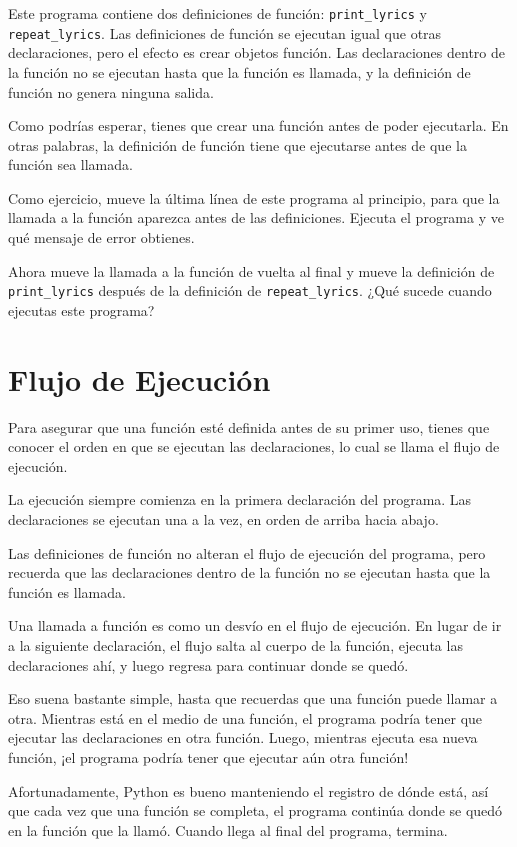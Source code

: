 \documentclass[12pt,letterpaper]{book}
\begin{document}
Este programa contiene dos definiciones de función: \texttt{print\_lyrics} y \texttt{repeat\_lyrics}. Las definiciones de función se ejecutan igual que otras declaraciones, pero el efecto es crear objetos función. Las declaraciones dentro de la función no se ejecutan hasta que la función es llamada, y la definición de función no genera ninguna salida.

Como podrías esperar, tienes que crear una función antes de poder ejecutarla. En otras palabras, la definición de función tiene que ejecutarse antes de que la función sea llamada.

Como ejercicio, mueve la última línea de este programa al principio, para que la llamada a la función aparezca antes de las definiciones. Ejecuta el programa y ve qué mensaje de error obtienes.

Ahora mueve la llamada a la función de vuelta al final y mueve la definición de \texttt{print\_lyrics} después de la definición de \texttt{repeat\_lyrics}. ¿Qué sucede cuando ejecutas este programa?

\section{Flujo de Ejecución}

Para asegurar que una función esté definida antes de su primer uso, tienes que conocer el orden en que se ejecutan las declaraciones, lo cual se llama el flujo de ejecución.

La ejecución siempre comienza en la primera declaración del programa. Las declaraciones se ejecutan una a la vez, en orden de arriba hacia abajo.

Las definiciones de función no alteran el flujo de ejecución del programa, pero recuerda que las declaraciones dentro de la función no se ejecutan hasta que la función es llamada.

Una llamada a función es como un desvío en el flujo de ejecución. En lugar de ir a la siguiente declaración, el flujo salta al cuerpo de la función, ejecuta las declaraciones ahí, y luego regresa para continuar donde se quedó.

Eso suena bastante simple, hasta que recuerdas que una función puede llamar a otra. Mientras está en el medio de una función, el programa podría tener que ejecutar las declaraciones en otra función. Luego, mientras ejecuta esa nueva función, ¡el programa podría tener que ejecutar aún otra función!

Afortunadamente, Python es bueno manteniendo el registro de dónde está, así que cada vez que una función se completa, el programa continúa donde se quedó en la función que la llamó. Cuando llega al final del programa, termina.
\end{document}
